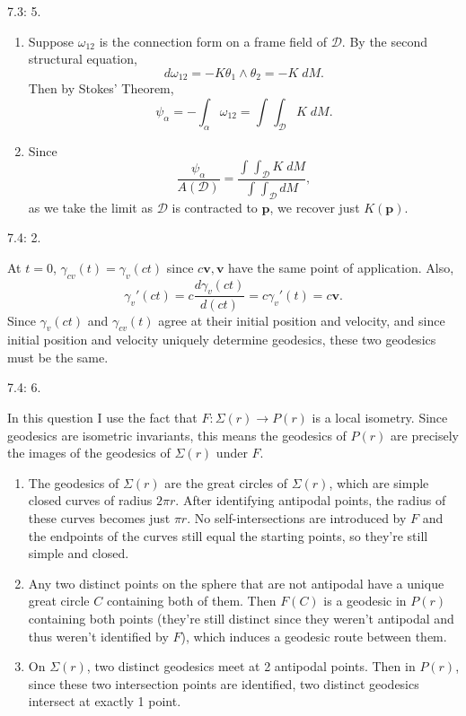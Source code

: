 \documentclass[10pt]{report}
\begin{document}
\pagebreak
\begin{exer}[]
7.3: 5.
\end{exer}
\begin{enumerate}
	\item Suppose $\omega_{12}$ is the connection form on a frame field of $\mathcal{D}$. By the second structural equation,
		\[
		d \omega_{12} = -K \theta_1 \wedge \theta_2 = -K \;dM.
		\] Then by Stokes' Theorem,
		\[
		\psi_{\alpha} = -\int_{\alpha} \omega_{12} = \int_{} \int_{\mathcal{D}} K\;dM.
		\] 

	\item Since
		\[
			\frac{\psi_{\alpha}}{A(\mathcal{D})} = \frac{\int_{} \int_{\mathcal{D}} K\;dM}{\int_{} \int_{\mathcal{D}} dM} ,
		\] as we take the limit as $\mathcal{D}$ is contracted to $\mathbf{p}$, we recover just $K(\mathbf{p})$.
\end{enumerate}

\begin{exer}[]
7.4: 2.
\end{exer}
At $t=0$, $\gamma_{cv}(t) = \gamma_{v}(ct)$ since $c\mathbf{v},\mathbf{v}$ have the same point of application. Also,
\[
	\gamma_{v}'(ct) = c \frac{d\gamma_{v}(ct)}{d(ct)} = c \gamma_{v}'(t) = c\mathbf{v}.
\] Since $\gamma_{v}(ct)$ and $\gamma_{cv}(t)$ agree at their initial position and velocity, and since initial position and velocity uniquely determine geodesics, these two geodesics must be the same.

\pagebreak
\begin{exer}[]
7.4: 6.
\end{exer}
In this question I use the fact that $F:\Sigma(r) \to P(r)$ is a local isometry. Since geodesics are isometric invariants, this means the geodesics of $P(r)$ are precisely the images of the geodesics of $\Sigma(r)$ under $F$.
\begin{enumerate}
	\item The geodesics of $\Sigma(r)$ are the great circles of $\Sigma(r)$, which are simple closed curves of radius $2\pi r$. After identifying antipodal points, the radius of these curves becomes just $\pi r$. No self-intersections are introduced by $F$ and the endpoints of the curves still equal the starting points, so they're still simple and closed.

	\item Any two distinct points on the sphere that are not antipodal have a unique great circle $C$ containing both of them. Then $F (C)$ is a geodesic in $P(r)$ containing both points (they're still distinct since they weren't antipodal and thus weren't identified by $F$), which induces a geodesic route between them.

	\item On $\Sigma(r)$, two distinct geodesics meet at 2 antipodal points. Then in $P(r)$, since these two intersection points are identified, two distinct geodesics intersect at exactly 1 point.
\end{enumerate}
\end{document}

